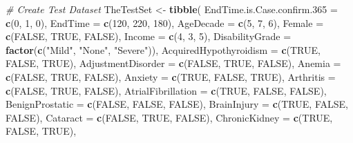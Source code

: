 \documentclass[
]{article}
\newenvironment{Shaded}{\begin{snugshade}}{\end{snugshade}}
\newcommand{\AttributeTok}[1]{\textcolor[rgb]{0.13,0.29,0.53}{#1}}
\newcommand{\CommentTok}[1]{\textcolor[rgb]{0.56,0.35,0.01}{\textit{#1}}}
\newcommand{\ConstantTok}[1]{\textcolor[rgb]{0.56,0.35,0.01}{#1}}
\newcommand{\DecValTok}[1]{\textcolor[rgb]{0.00,0.00,0.81}{#1}}
\newcommand{\FunctionTok}[1]{\textcolor[rgb]{0.13,0.29,0.53}{\textbf{#1}}}
\newcommand{\NormalTok}[1]{#1}
\newcommand{\OtherTok}[1]{\textcolor[rgb]{0.56,0.35,0.01}{#1}}
\newcommand{\StringTok}[1]{\textcolor[rgb]{0.31,0.60,0.02}{#1}}
\begin{document}
\begin{Shaded}
\begin{Highlighting}[]
\CommentTok{\# Create Test Dataset}
\NormalTok{TheTestSet }\OtherTok{\textless{}{-}} \FunctionTok{tibble}\NormalTok{(}
  \AttributeTok{EndTime.is.Case.confirm.365 =} \FunctionTok{c}\NormalTok{(}\DecValTok{0}\NormalTok{, }\DecValTok{1}\NormalTok{, }\DecValTok{0}\NormalTok{),}
  \AttributeTok{EndTime =} \FunctionTok{c}\NormalTok{(}\DecValTok{120}\NormalTok{, }\DecValTok{220}\NormalTok{, }\DecValTok{180}\NormalTok{),}
  \AttributeTok{AgeDecade =} \FunctionTok{c}\NormalTok{(}\DecValTok{5}\NormalTok{, }\DecValTok{7}\NormalTok{, }\DecValTok{6}\NormalTok{),}
  \AttributeTok{Female =} \FunctionTok{c}\NormalTok{(}\ConstantTok{FALSE}\NormalTok{, }\ConstantTok{TRUE}\NormalTok{, }\ConstantTok{FALSE}\NormalTok{),}
  \AttributeTok{Income =} \FunctionTok{c}\NormalTok{(}\DecValTok{4}\NormalTok{, }\DecValTok{3}\NormalTok{, }\DecValTok{5}\NormalTok{),}
  \AttributeTok{DisabilityGrade =} \FunctionTok{factor}\NormalTok{(}\FunctionTok{c}\NormalTok{(}\StringTok{"Mild"}\NormalTok{, }\StringTok{"None"}\NormalTok{, }\StringTok{"Severe"}\NormalTok{)),}
  \AttributeTok{AcquiredHypothyroidism =} \FunctionTok{c}\NormalTok{(}\ConstantTok{TRUE}\NormalTok{, }\ConstantTok{FALSE}\NormalTok{, }\ConstantTok{TRUE}\NormalTok{),}
  \AttributeTok{AdjustmentDisorder =} \FunctionTok{c}\NormalTok{(}\ConstantTok{FALSE}\NormalTok{, }\ConstantTok{TRUE}\NormalTok{, }\ConstantTok{FALSE}\NormalTok{),}
  \AttributeTok{Anemia =} \FunctionTok{c}\NormalTok{(}\ConstantTok{FALSE}\NormalTok{, }\ConstantTok{TRUE}\NormalTok{, }\ConstantTok{FALSE}\NormalTok{),}
  \AttributeTok{Anxiety =} \FunctionTok{c}\NormalTok{(}\ConstantTok{TRUE}\NormalTok{, }\ConstantTok{FALSE}\NormalTok{, }\ConstantTok{TRUE}\NormalTok{),}
  \AttributeTok{Arthritis =} \FunctionTok{c}\NormalTok{(}\ConstantTok{FALSE}\NormalTok{, }\ConstantTok{TRUE}\NormalTok{, }\ConstantTok{FALSE}\NormalTok{),}
  \AttributeTok{AtrialFibrillation =} \FunctionTok{c}\NormalTok{(}\ConstantTok{TRUE}\NormalTok{, }\ConstantTok{FALSE}\NormalTok{, }\ConstantTok{FALSE}\NormalTok{),}
  \AttributeTok{BenignProstatic =} \FunctionTok{c}\NormalTok{(}\ConstantTok{FALSE}\NormalTok{, }\ConstantTok{FALSE}\NormalTok{, }\ConstantTok{FALSE}\NormalTok{),}
  \AttributeTok{BrainInjury =} \FunctionTok{c}\NormalTok{(}\ConstantTok{TRUE}\NormalTok{, }\ConstantTok{FALSE}\NormalTok{, }\ConstantTok{FALSE}\NormalTok{),}
  \AttributeTok{Cataract =} \FunctionTok{c}\NormalTok{(}\ConstantTok{FALSE}\NormalTok{, }\ConstantTok{TRUE}\NormalTok{, }\ConstantTok{FALSE}\NormalTok{),}
  \AttributeTok{ChronicKidney =} \FunctionTok{c}\NormalTok{(}\ConstantTok{TRUE}\NormalTok{, }\ConstantTok{FALSE}\NormalTok{, }\ConstantTok{TRUE}\NormalTok{),}

\end{Highlighting}
\end{Shaded}
\end{document}
